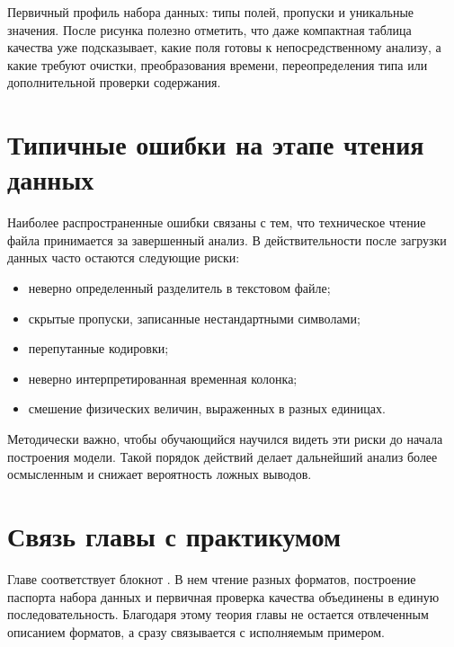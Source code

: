 \figureinstruction
  {Первичный профиль набора данных: типы полей, пропуски и уникальные значения.}
  {После рисунка полезно отметить, что даже компактная таблица качества уже подсказывает, какие поля готовы к непосредственному анализу, а какие требуют очистки, преобразования времени, переопределения типа или дополнительной проверки содержания.}

\section{Типичные ошибки на этапе чтения данных}

Наиболее распространенные ошибки связаны с тем, что техническое чтение файла принимается за завершенный анализ. В действительности после загрузки данных часто остаются следующие риски:
\begin{itemize}[leftmargin=1.25cm]
\item неверно определенный разделитель в текстовом файле;
\item скрытые пропуски, записанные нестандартными символами;
\item перепутанные кодировки;
\item неверно интерпретированная временная колонка;
\item смешение физических величин, выраженных в разных единицах.
\end{itemize}

Методически важно, чтобы обучающийся научился видеть эти риски до начала построения модели. Такой порядок действий делает дальнейший анализ более осмысленным и снижает вероятность ложных выводов.

\section{Связь главы с практикумом}

Главе соответствует блокнот . В нем чтение разных форматов, построение паспорта набора данных и первичная проверка качества объединены в единую последовательность. Благодаря этому теория главы не остается отвлеченным описанием форматов, а сразу связывается с исполняемым примером.
